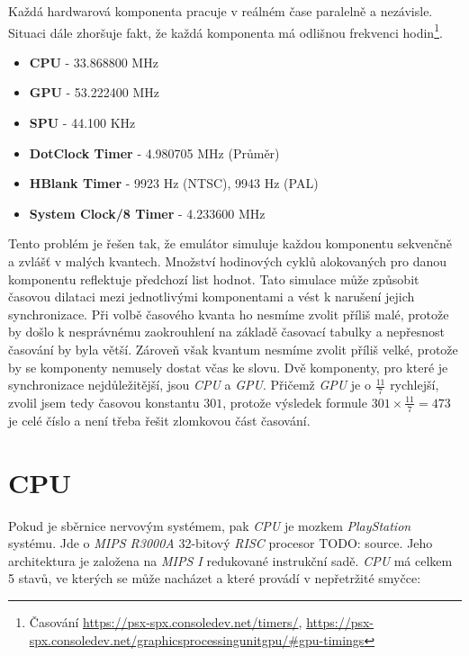 Každá hardwarová komponenta pracuje v reálném čase paralelně a nezávisle. Situaci dále zhoršuje fakt, že každá komponenta má odlišnou frekvenci hodin\footnote{Časování\cite{PSXSpec} \url{https://psx-spx.consoledev.net/timers/}, \url{https://psx-spx.consoledev.net/graphicsprocessingunitgpu/\#gpu-timings}}.

\begin{itemize}
    \label{Rychlost hodin komponent}
    \item{\textbf{CPU} - 33.868800 MHz}
    \item{\textbf{GPU} - 53.222400 MHz}
    \item{\textbf{SPU} - 44.100 KHz}
    \item{\textbf{DotClock Timer} - 4.980705 MHz (Průměr)}
    \item{\textbf{HBlank Timer} - 9923 Hz (NTSC), 9943 Hz (PAL)}
    \item{\textbf{System Clock/8 Timer} - 4.233600 MHz}
\end{itemize}

Tento problém je řešen tak, že emulátor simuluje každou komponentu sekvenčně a zvlášť v malých kvantech. 
Množství hodinových cyklů alokovaných pro danou komponentu reflektuje předchozí list hodnot. 
Tato simulace může způsobit časovou dilataci mezi jednotlivými komponentami a vést k narušení jejich synchronizace. 
Při volbě časového kvanta ho nesmíme zvolit příliš malé, protože by došlo k nesprávnému zaokrouhlení na základě časovací tabulky a nepřesnost časování by byla větší. 
Zároveň však kvantum nesmíme zvolit příliš velké, protože by se komponenty nemusely dostat včas ke slovu. 
Dvě komponenty, pro které je synchronizace nejdůležitější, jsou \textit{CPU} a \textit{GPU}. 
Přičemž \textit{GPU} je o $\frac{11}{7}$ rychlejší, zvolil jsem tedy časovou konstantu $301$, protože výsledek formule $301\times\frac{11}{7}=473$ je celé číslo a není
třeba řešit zlomkovou část časování.

\section{CPU}

Pokud je sběrnice nervovým systémem, pak \textit{CPU} je mozkem \textit{PlayStation} systému. Jde
o \textit{MIPS R3000A} 32-bitový \textit{RISC} procesor TODO: source. Jeho architektura je založena na \textit{MIPS I} redukované instrukční sadě.
\textit{CPU} má celkem 5 stavů, ve kterých se může nacházet a které provádí v nepřetržité smyčce:

